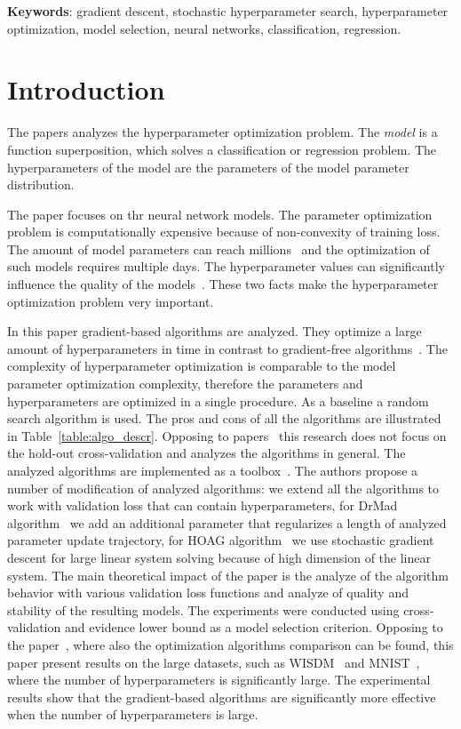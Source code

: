 \documentclass[12pt]{article}
\begin{document}
\textbf{Keywords}:  gradient descent, stochastic hyperparameter search, hyperparameter optimization, model selection, neural networks, classification, regression.
\section{Introduction}
The papers analyzes the hyperparameter optimization problem. The \textit{model} is a function superposition, which solves a classification or regression problem. The hyperparameters of the model are the parameters of the model parameter distribution.

The paper focuses on thr neural network models. The parameter optimization problem is computationally expensive because of non-convexity of training loss. The amount of model parameters can reach millions~\cite{hinton_rbm}  and the optimization of such models requires multiple days\cite{suts}.   The hyperparameter values can significantly influence the quality of the models~\cite{journal1,journal2}. These two facts make the hyperparameter optimization problem very important.

In this paper gradient-based algorithms are analyzed. They optimize a large amount of hyperparameters in time in contrast to gradient-free algorithms~\cite{hyper}.  The complexity of hyperparameter optimization is comparable to the model parameter optimization complexity, therefore the parameters and hyperparameters are  optimized in a single procedure. As a baseline a random search algorithm is used. The pros and cons of all the algorithms  
are illustrated in Table~\ref{table:algo_descr}. Opposing to papers~\cite{hyper_mad, hyper_hoag, hyper_greed} this research does not focus on the hold-out cross-validation and analyzes the algorithms in general. The analyzed algorithms are implemented as a toolbox~\cite{pyfos}. The authors propose a number of modification of analyzed algorithms: we extend all the algorithms to work with validation loss that can contain hyperparameters, for DrMad algorithm~\cite{hyper_mad} we add an additional parameter that regularizes a length of analyzed parameter update trajectory, for HOAG algorithm~\cite{hyper_hoag} we use stochastic gradient descent for large linear system solving because of high dimension of the linear system.   The main theoretical impact of the paper is the analyze of the algorithm behavior with various validation loss functions and analyze of quality and stability of the resulting models. The experiments were conducted using cross-validation and evidence lower bound as a model selection criterion. Opposing to the paper~\cite{hyper_hoag}, where also the optimization algorithms comparison can be found, this paper present results on the large datasets, such as  WISDM~\cite{wisdm} and MNIST~\cite{mnist}, where the number of hyperparameters is significantly large. 
The experimental results show that the gradient-based algorithms are significantly more effective when the number of hyperparameters is large. 
\end{document}
